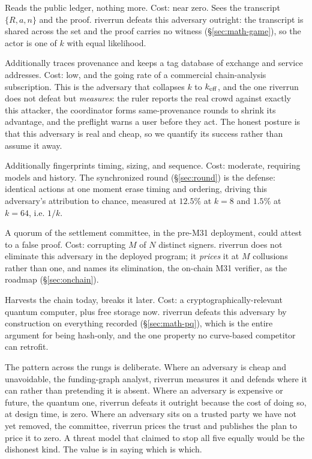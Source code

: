 \documentclass[11pt]{article}
\begin{document}
\begin{description}[leftmargin=1.4em,itemsep=0.3em]
\item[The passive observer.] Reads the public ledger, nothing more. Cost: near zero. Sees
the transcript $\{R, a, n\}$ and the proof. riverrun defeats this adversary outright: the
transcript is shared across the set and the proof carries no witness
(\S\ref{sec:math-game}), so the actor is one of $k$ with equal likelihood.
\item[The funding-graph analyst.] Additionally traces provenance and keeps a tag database
of exchange and service addresses. Cost: low, and the going rate of a commercial
chain-analysis subscription. This is the adversary that collapses $k$ to $k_{\mathrm{eff}}$, and the
one riverrun does not defeat but \emph{measures}: the ruler reports the real crowd against
exactly this attacker, the coordinator forms same-provenance rounds to shrink its
advantage, and the preflight warns a user before they act. The honest posture is that this
adversary is real and cheap, so we quantify its success rather than assume it away.
\item[The behavioral cluster analyst.] Additionally fingerprints timing, sizing, and
sequence. Cost: moderate, requiring models and history. The synchronized round
(\S\ref{sec:round}) is the defense: identical actions at one moment erase timing and
ordering, driving this adversary's attribution to chance, measured at $12.5\%$ at $k{=}8$
and $1.5\%$ at $k{=}64$, i.e. $1/k$.
\item[The colluding committee.] A quorum of the settlement committee, in the pre-M31
deployment, could attest to a false proof. Cost: corrupting $M$ of $N$ distinct signers.
riverrun does not eliminate this adversary in the deployed program; it \emph{prices} it at
$M$ collusions rather than one, and names its elimination, the on-chain M31 verifier, as
the roadmap (\S\ref{sec:onchain}).
\item[The future quantum adversary.] Harvests the chain today, breaks it later. Cost: a
cryptographically-relevant quantum computer, plus free storage now. riverrun defeats this
adversary by construction on everything recorded (\S\ref{sec:math-pq}), which is the entire
argument for being hash-only, and the one property no curve-based competitor can retrofit.
\end{description}

The pattern across the rungs is deliberate. Where an adversary is cheap and unavoidable,
the funding-graph analyst, riverrun measures it and defends where it can rather than
pretending it is absent. Where an adversary is expensive or future, the quantum one,
riverrun defeats it outright because the cost of doing so, at design time, is zero.
Where an adversary sits on a trusted party we have not yet removed, the committee, riverrun
prices the trust and publishes the plan to price it to zero. A threat model that claimed to
stop all five equally would be the dishonest kind. The value is in saying which is which.
\end{document}
